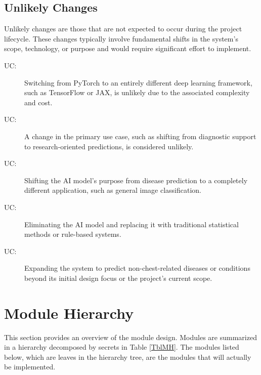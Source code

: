 \documentclass[12pt, titlepage]{article}
\newcounter{ucnum}
\newcommand{\uctheucnum}{UC\theucnum}
\begin{document}
\subsection{Unlikely Changes} \label{SecUchange}

Unlikely changes are those that are not expected to occur during the project lifecycle. These changes typically involve fundamental shifts in the system's scope, technology, or purpose and would require significant effort to implement.


\begin{description}
\item[ \uctheucnum \label{ucFrameworkMigration}:] Switching from PyTorch to an entirely different deep learning framework, such as TensorFlow or JAX, is unlikely due to the associated complexity and cost.

\item[ \uctheucnum \label{ucPurpose}:] A change in the primary use case, such as shifting from diagnostic support to research-oriented predictions, is considered unlikely.

\item[ \uctheucnum \label{ucObjective}:] Shifting the AI model's purpose from disease prediction to a completely different application, such as general image classification.

\item[ \uctheucnum \label{ucNonAI}:] Eliminating the AI model and replacing it with traditional statistical methods or rule-based systems.

\item[ \uctheucnum \label{ucScopeExpansion}:] Expanding the system to predict non-chest-related diseases or conditions beyond its initial design focus or the project's current scope.
\end{description}

\section{Module Hierarchy} \label{SecMH}

This section provides an overview of the module design. Modules are summarized
in a hierarchy decomposed by secrets in Table \ref{TblMH}. The modules listed
below, which are leaves in the hierarchy tree, are the modules that will
actually be implemented.
\end{document}
